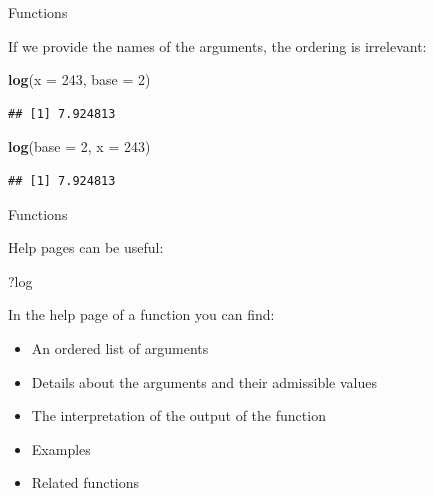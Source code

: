 \documentclass[ignorenonframetext,]{beamer}
\newenvironment{Shaded}{\begin{snugshade}}{\end{snugshade}}
\newcommand{\DataTypeTok}[1]{\textcolor[rgb]{0.13,0.29,0.53}{#1}}
\newcommand{\DecValTok}[1]{\textcolor[rgb]{0.00,0.00,0.81}{#1}}
\newcommand{\KeywordTok}[1]{\textcolor[rgb]{0.13,0.29,0.53}{\textbf{#1}}}
\newcommand{\NormalTok}[1]{#1}
\begin{document}
\begin{frame}[fragile]{Functions}
\protect\hypertarget{functions-8}{}

If we provide the names of the arguments, the ordering is irrelevant:

\begin{Shaded}
\begin{Highlighting}[]
\KeywordTok{log}\NormalTok{(}\DataTypeTok{x =} \DecValTok{243}\NormalTok{, }\DataTypeTok{base =} \DecValTok{2}\NormalTok{)}
\end{Highlighting}
\end{Shaded}

\begin{verbatim}
## [1] 7.924813
\end{verbatim}

\begin{Shaded}
\begin{Highlighting}[]
\KeywordTok{log}\NormalTok{(}\DataTypeTok{base =} \DecValTok{2}\NormalTok{, }\DataTypeTok{x =} \DecValTok{243}\NormalTok{)}
\end{Highlighting}
\end{Shaded}

\begin{verbatim}
## [1] 7.924813
\end{verbatim}

\end{frame}

\begin{frame}[fragile]{Functions}
\protect\hypertarget{functions-9}{}

Help pages can be useful:

\begin{Shaded}
\begin{Highlighting}[]
\NormalTok{?log}
\end{Highlighting}
\end{Shaded}

In the help page of a function you can find:

\begin{itemize}
\item
  An ordered list of arguments
\item
  Details about the arguments and their admissible values
\item
  The interpretation of the output of the function
\item
  Examples
\item
  Related functions
\end{itemize}

\end{frame}
\end{document}
